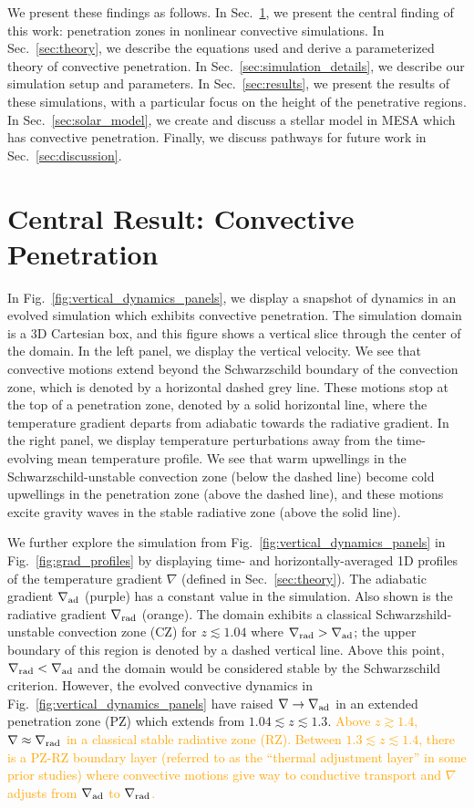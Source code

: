 \documentclass[twocolumn, linenumbers]{aastex631}
\newcommand{\gradrad}{\ensuremath{\nabla_{\rm{rad}}}}
\newcommand{\gradad}{\ensuremath{\nabla_{\rm{ad}}}}
\newcommand{\justgrad}{\ensuremath{\nabla}}
\newcommand{\editone}[1]{\textcolor{orange}{#1}}
\begin{document}
We present these findings as follows.
In Sec.~\ref{sec:central_results}, we present the central finding of this work: penetration zones in nonlinear convective simulations.
In Sec.~\ref{sec:theory}, we describe the equations used and derive a parameterized theory of convective penetration.
In Sec.~\ref{sec:simulation_details}, we describe our simulation setup and parameters.
In Sec.~\ref{sec:results}, we present the results of these simulations, with a particular focus on the height of the penetrative regions.
In Sec.~\ref{sec:solar_model}, we create and discuss a stellar model in MESA which has convective penetration.
Finally, we discuss pathways for future work in Sec.~\ref{sec:discussion}.

\section{Central Result: Convective Penetration}
\label{sec:central_results}

In Fig.~\ref{fig:vertical_dynamics_panels}, we display a snapshot of dynamics in an evolved simulation which exhibits convective penetration.
The simulation domain is a 3D Cartesian box, and this figure shows a vertical slice through the center of the domain.
In the left panel, we display the vertical velocity.
We see that convective motions extend beyond the Schwarzschild boundary of the convection zone, which is denoted by a horizontal dashed grey line.
These motions stop at the top of a penetration zone, denoted by a solid horizontal line, where the temperature gradient departs from adiabatic towards the radiative gradient.
In the right panel, we display temperature perturbations away from the time-evolving mean temperature profile.
We see that warm upwellings in the Schwarzschild-unstable convection zone (below the dashed line) become cold upwellings in the penetration zone (above the dashed line), and these motions excite gravity waves in the stable radiative zone (above the solid line).

We further explore the simulation from Fig.~\ref{fig:vertical_dynamics_panels} in Fig.~\ref{fig:grad_profiles} by displaying time- and horizontally-averaged 1D profiles of the temperature gradient $\justgrad$ (defined in Sec.~\ref{sec:theory}).
The adiabatic gradient $\gradad$ (purple) has a constant value in the simulation.
Also shown is the radiative gradient $\gradrad$ (orange).
The domain exhibits a classical Schwarzshild-unstable convection zone (CZ) for $z \lesssim 1.04$ where $\gradrad > \gradad$; the upper boundary of this region is denoted by a dashed vertical line.
Above this point, $\gradrad < \gradad$ and the domain would be considered stable by the Schwarzschild criterion.
However, the evolved convective dynamics in Fig.~\ref{fig:vertical_dynamics_panels} have raised $\justgrad \rightarrow \gradad$ in an extended penetration zone (PZ) which extends from $1.04 \lesssim z \lesssim 1.3$.
\editone{
    Above $z \gtrsim 1.4$, $\justgrad \approx \gradrad$ in a classical stable radiative zone (RZ).
    Between $1.3 \lesssim z \lesssim 1.4$, there is a PZ-RZ boundary layer (referred to as the ``thermal adjustment layer'' in some prior studies) where convective motions give way to conductive transport and $\justgrad$ adjusts from $\gradad$ to $\gradrad$.
}
\end{document}
